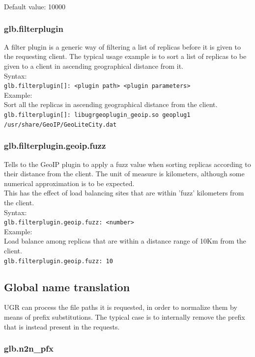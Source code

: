 \documentclass[12pt]{article} %
\begin{document}
Default value: 10000

\subsubsection{glb.filterplugin}
A filter plugin is a generic way of filtering a list of replicas before it is given to the requesting client.
The typical usage example is to sort a list of replicas to be given to a client in ascending geographical distance from it.
\\
Syntax:\\
\lstinline"glb.filterplugin[]: <plugin path> <plugin parameters>"
\\
Example:\\
Sort all the replicas in ascending geographical distance from the client.
\lstinline"glb.filterplugin[]: libugrgeoplugin_geoip.so geoplug1 /usr/share/GeoIP/GeoLiteCity.dat"

\subsubsection{glb.filterplugin.geoip.fuzz}
Tells to the GeoIP plugin to apply a fuzz value when sorting replicas according to their distance from the client. The unit of measure is kilometers, although some numerical approximation is to be expected.\\
This has the effect of load balancing sites that are within 'fuzz' kilometers from the client.
\\
Syntax:\\
\lstinline"glb.filterplugin.geoip.fuzz: <number>"
\\
Example:\\
Load balance among replicas that are within a distance range of 10Km from the client.\\
\lstinline"glb.filterplugin.geoip.fuzz: 10"

\subsection{\label{globalxlation}Global name translation}

UGR can process the file paths it is requested, in order to normalize them by means of prefix substitutions. The typical case is to internally remove the prefix that is instead present in the requests.

\subsubsection{glb.n2n\_pfx}
\end{document}
